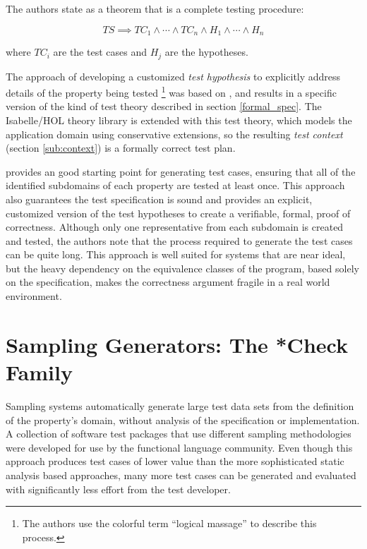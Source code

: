 The authors state as a theorem that  \HOLTG is a complete testing procedure:

\begin{theorem}

$$TS \implies TC_1 \land \cdots  \land TC_n \land H_1 \land \cdots \land H_n$$

where $TC_i$ are the test cases and $H_j$ are the hypotheses.
\end{theorem}

\noindent The  approach of developing a customized  \emph{test hypothesis} to 
explicitly address details of the property being tested
\footnote{The authors use the colorful term ``logical massage'' to describe this process.}
was based on \cite{Gaudel1995},
and results in a specific version of the kind of 
test theory described in section \ref{formal_spec}.
The Isabelle/HOL theory library is extended with this test theory,
which models the application domain using conservative extensions,
so the resulting \emph{test context} (section \ref{sub:context}) is a formally correct test plan.

\HOLTG provides an good starting point for generating test cases,
ensuring that all of the identified subdomains of each property are tested at least once.
This approach also guarantees the test specification is sound and
provides an explicit, customized version of the test hypotheses
to create a verifiable, formal, proof of correctness.
Although only one representative from each subdomain is created and tested,
the authors note that the process required to generate the test cases
can be quite long.
This approach is well suited for systems that are near ideal,
but the heavy dependency on the equivalence classes of the program,
based solely on the specification,
makes the correctness argument fragile in a real world environment.

\section{Sampling Generators: The *Check Family}\label{sec:samplegens}

Sampling \pbt systems automatically generate large test data sets
from the definition of the property's domain,
without analysis of the specification or implementation.
A collection of software test packages that use different sampling methodologies
were developed for use by the functional language community.
Even though this approach produces test cases of lower value
than the more sophisticated static analysis based approaches,
many more test cases can be generated and evaluated with
significantly less effort from the test developer.


